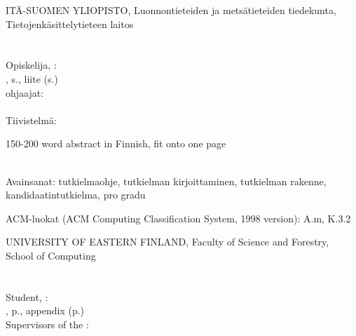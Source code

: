 \vspace{0.5cm}

\thispagestyle{empty}


\begin{spacing}{1.0}
\begin{otherlanguage}{finnish}
\newpage



ITÄ-SUOMEN YLIOPISTO, Luonnontieteiden ja metsätieteiden tiedekunta, \campus Tietojenkäsittelytieteen laitos\\
\facultyschoolfin \\
\\ 
Opiskelija, \authorname : \thesistitle \\
\documenttypefin , \mypagecount s., \myappendixcount liite (\myappendixpagecount s.)\\
\documenttypefin ohjaajat: \supervisorsfin \\
\ajankohta \\


Tiivistelmä:

150-200 word abstract in Finnish, fit onto one page





~\\ %
Avainsanat:
tutkielmaohje, tutkielman kirjoittaminen, tutkielman rakenne,
kandidaatintutkielma, pro gradu




ACM-luokat (ACM Computing Classification System,
1998 version): A.m, K.3.2\\

\end{otherlanguage}
\newpage


UNIVERSITY OF EASTERN FINLAND, Faculty of Science and Forestry, \campus School of Computing\\
\facultyschooleng \\ \\
Student, \authorname : \thesistitle \\
\documenttypeeng , \mypagecount p., \myappendixcount appendix (\myappendixpagecount p.)\\
Supervisors of the \documenttypeeng : \supervisorseng \\
\ajankohtaenglish \\



\end{spacing}

